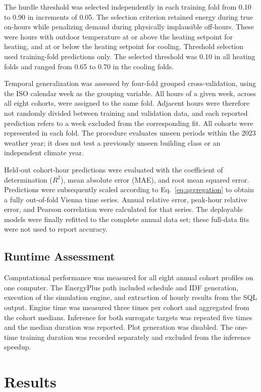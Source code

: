 \documentclass[10pt,twocolumn]{article}
\begin{document}
The hurdle threshold was selected independently in each training fold from
0.10 to 0.90 in increments of 0.05. The selection criterion retained energy
during true on-hours while penalizing demand during physically implausible
off-hours. These were hours with outdoor temperature at or above the heating
setpoint for heating, and at or below the heating setpoint for cooling.
Threshold selection used training-fold predictions only. The selected
threshold was 0.10 in all heating folds and ranged from 0.65 to 0.70 in the
cooling folds.

Temporal generalization was assessed by four-fold grouped cross-validation,
using the ISO calendar week as the grouping variable. All hours of a given
week, across all eight cohorts, were assigned to the same fold. Adjacent hours
were therefore not randomly divided between training and validation data, and
each reported prediction refers to a week excluded from the corresponding
fit. All cohorts were represented in each fold. The procedure evaluates unseen
periods within the 2023 weather year; it does not test a previously unseen
building class or an independent climate year.

Held-out cohort-hour predictions were evaluated with the coefficient of
determination ($R^2$), mean absolute error (MAE), and root mean squared error.
Predictions were subsequently scaled according to
Eq.~\eqref{eq:aggregation} to obtain a fully out-of-fold Vienna time series.
Annual relative error, peak-hour relative error, and Pearson correlation were
calculated for that series. The deployable models were finally refitted to the
complete annual data set; these full-data fits were not used to report
accuracy.

\subsection{Runtime Assessment}

Computational performance was measured for all eight annual cohort profiles on
one computer. The EnergyPlus path included schedule and IDF generation,
execution of the simulation engine, and extraction of hourly results from the
SQL output. Engine time was measured three times per cohort and aggregated
from the cohort medians. Inference for both surrogate targets was repeated five
times and the median duration was reported. Plot generation was disabled. The
one-time training duration was recorded separately and excluded from the
inference speedup.

\section{Results}
\end{document}
